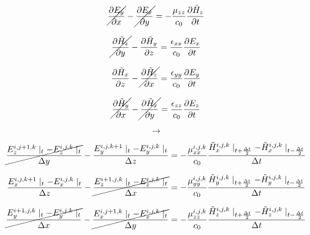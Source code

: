 \documentclass[a4paper,10pt]{article}
\begin{document}
\begin{equation*}
  \cancel{\frac{\partial E_y}{\partial x}} - \cancel{\frac{\partial E_x}{\partial y}} = -\frac{\mu_{zz}}{c_0}\frac{\partial\tilde{H}_z}{\partial t}
\end{equation*}

\begin{equation*}
  \cancel{\frac{\partial \tilde{H}_z}{\partial y}} - \frac{\partial \tilde{H}_y}{\partial z} = \frac{\epsilon_{xx}}{c_0}\frac{\partial E_x}{\partial t}
\end{equation*}

\begin{equation*}
  \frac{\partial \tilde{H}_x}{\partial z} - \cancel{\frac{\partial \tilde{H}_z}{\partial x}} = \frac{\epsilon_{yy}}{c_0}\frac{\partial E_y}{\partial t}
\end{equation*}

\begin{equation*}
  \cancel{\frac{\partial \tilde{H}_y}{\partial x}} - \cancel{\frac{\partial \tilde{H}_x}{\partial y}} = \frac{\epsilon_{zz}}{c_0}\frac{\partial E_z}{\partial t}
\end{equation*}

\[\longrightarrow\]

\begin{equation*}
  \cancel{\frac{E_{z}^{i,j+1,k}\mid_{t} - E_{z}^{i,j,k}\mid_{t}}{\Delta y}} - \frac{E_{y}^{i,j,k+1}\mid_{t} - E_{y}^{i,j,k}\mid_{t}}{\Delta z} = -\frac{\mu_{xx}^{i,j,k}}{c_0} \frac{\tilde{H}_{x}^{i,j,k}\mid_{t+\frac  {\Delta t}{2}} - \tilde{H}_{x}^{i,j,k}\mid_{t-\frac{\Delta t}{2}}}{\Delta t}\notag
\end{equation*}

\begin{equation*}
  \frac{E_{x}^{i,j,k+1}\mid_{t} - E_{x}^{i,j,k}\mid_{t}}{\Delta z} - \cancel{\frac{E_{z}^{i+1,j,k}\mid_{t} - E_{z}^{i,j,k}\mid_{t}}{\Delta x}} = -\frac{\mu_{yy}^{i,j,k}}{c_0} \frac{\tilde{H}_{y}^{i,j,k}\mid_{t+\frac  {\Delta t}{2}} - \tilde{H}_{y}^{i,j,k}\mid_{t-\frac{\Delta t}{2}}}{\Delta t}\notag
\end{equation*}

\begin{equation*}
  \cancel{\frac{E_{y}^{i+1,j,k}\mid_{t} - E_{y}^{i,j,k}\mid_{t}}{\Delta x}} - \cancel{\frac{E_{x}^{i,j+1,k}\mid_{t} - E_{x}^{i,j,k}\mid_{t}}{\Delta y}} = -\frac{\mu_{zz}^{i,j,k}}{c_0} \frac{\tilde{H}_{z}^{i,j,k}\mid_{t+\frac  {\Delta t}{2}} - \tilde{H}_{z}^{i,j,k}\mid_{t-\frac{\Delta t}{2}}}{\Delta t}\notag
\end{equation*}
\end{document}
